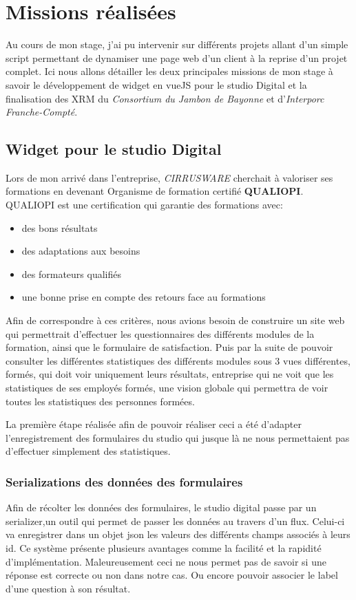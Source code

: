 \section{Missions réalisées}
Au cours de mon stage, j'ai pu intervenir sur différents projets allant d'un simple script permettant de dynamiser une page web d'un client à la reprise d'un projet complet. Ici nous allons détailler les deux principales missions de mon stage à savoir le développement de widget en vueJS pour le studio Digital et la finalisation des XRM du \textit{Consortium du Jambon de Bayonne} et d'\textit{Interporc Franche-Compté}.

\subsection{Widget pour le studio Digital}
Lors de mon arrivé dans l'entreprise, \textit{CIRRUSWARE} cherchait à valoriser ses formations en devenant Organisme de formation certifié \textbf{QUALIOPI}. QUALIOPI est une certification qui garantie des formations avec: 
\begin{itemize}
    \item des bons résultats
    \item des adaptations aux besoins
    \item des formateurs qualifiés
    \item une bonne prise en compte des retours face au formations
\end{itemize} 
Afin de correspondre à ces critères, nous avions besoin de construire un site web qui permettrait d'effectuer les questionnaires des différents modules de la formation, ainsi que le formulaire de satisfaction. Puis par la suite de pouvoir consulter les différentes statistiques des différents modules sous 3 vues différentes, formés, qui doit voir uniquement leurs résultats, entreprise qui ne voit que les statistiques de ses employés formés, une vision globale qui permettra de voir toutes les statistiques des personnes formées.

La première étape réalisée afin de pouvoir réaliser ceci a été d'adapter l'enregistrement des formulaires du studio qui jusque là ne nous permettaient pas d'effectuer simplement des statistiques. 

\subsubsection{Serializations des données des formulaires}

Afin de récolter les données des formulaires, le studio digital passe par un serializer,un outil qui permet de passer les données au travers d'un flux. Celui-ci va enregistrer dans un objet json les valeurs des différents champs associés à leurs id. Ce système présente plusieurs avantages comme la facilité et la rapidité d'implémentation. Maleureusement ceci ne nous permet pas de savoir si une réponse est correcte ou non dans notre cas. Ou encore pouvoir associer le label d'une question à son résultat. 

